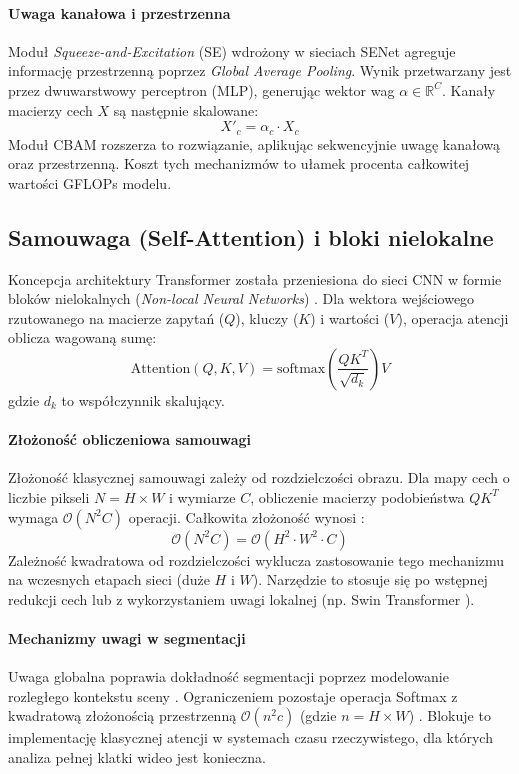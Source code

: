 \paragraph{Uwaga kanałowa i przestrzenna}
Moduł \textit{Squeeze-and-Excitation} (SE) wdrożony w sieciach SENet  agreguje informację przestrzenną poprzez \textit{Global Average Pooling}. Wynik przetwarzany jest przez dwuwarstwowy perceptron (MLP), generując wektor wag $\alpha \in \mathbb{R}^C$. Kanały macierzy cech $X$ są następnie skalowane:
$$ X'_{c} = \alpha_c \cdot X_c $$
Moduł CBAM  rozszerza to rozwiązanie, aplikując sekwencyjnie uwagę kanałową oraz przestrzenną. Koszt tych mechanizmów to ułamek procenta całkowitej wartości GFLOPs modelu.

\subsection{Samouwaga (Self-Attention) i bloki nielokalne}
Koncepcja architektury Transformer  została przeniesiona do sieci CNN w formie bloków nielokalnych (\textit{Non-local Neural Networks}) . Dla wektora wejściowego rzutowanego na macierze zapytań ($Q$), kluczy ($K$) i wartości ($V$), operacja atencji oblicza wagowaną sumę:
$$ \text{Attention}(Q, K, V) = \text{softmax}\left(\frac{QK^T}{\sqrt{d_k}}\right)V $$
gdzie $d_k$ to współczynnik skalujący.

\paragraph{Złożoność obliczeniowa samouwagi}
Złożoność klasycznej samouwagi zależy od rozdzielczości obrazu. Dla mapy cech o liczbie pikseli $N = H \times W$ i wymiarze $C$, obliczenie macierzy podobieństwa $QK^T$ wymaga $\mathcal{O}(N^2 C)$ operacji. Całkowita złożoność wynosi :
$$ \mathcal{O}(N^2 C) = \mathcal{O}(H^2 \cdot W^2 \cdot C) $$
Zależność kwadratowa od rozdzielczości wyklucza zastosowanie tego mechanizmu na wczesnych etapach sieci (duże $H$ i $W$). Narzędzie to stosuje się po wstępnej redukcji cech lub z wykorzystaniem uwagi lokalnej (np. Swin Transformer ).

\paragraph{Mechanizmy uwagi w segmentacji}
Uwaga globalna poprawia dokładność segmentacji poprzez modelowanie rozległego kontekstu sceny . Ograniczeniem pozostaje operacja Softmax z kwadratową złożonością przestrzenną $\mathcal{O}(n^2c)$ (gdzie $n = H \times W$) . Blokuje to implementację klasycznej atencji w systemach czasu rzeczywistego, dla których analiza pełnej klatki wideo jest konieczna.

